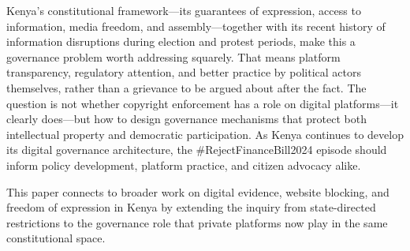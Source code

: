 \documentclass{article}
\begin{document}
Kenya's constitutional framework—its guarantees of expression, access to information, media freedom, and assembly—together with its recent history of information disruptions during election and protest periods, make this a governance problem worth addressing squarely. That means platform transparency, regulatory attention, and better practice by political actors themselves, rather than a grievance to be argued about after the fact. The question is not whether copyright enforcement has a role on digital platforms—it clearly does—but how to design governance mechanisms that protect both intellectual property and democratic participation. As Kenya continues to develop its digital governance architecture, the \#RejectFinanceBill2024 episode should inform policy development, platform practice, and citizen advocacy alike.

This paper connects to broader work on digital evidence, website blocking, and freedom of expression in Kenya by extending the inquiry from state-directed restrictions to the governance role that private platforms now play in the same constitutional space.



\end{document}

